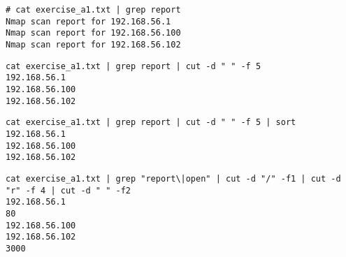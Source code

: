 \begin{verbatim}
# cat exercise_a1.txt | grep report
Nmap scan report for 192.168.56.1
Nmap scan report for 192.168.56.100
Nmap scan report for 192.168.56.102
\end{verbatim}

\begin{verbatim}
cat exercise_a1.txt | grep report | cut -d " " -f 5
192.168.56.1
192.168.56.100
192.168.56.102
\end{verbatim}

\begin{verbatim}
cat exercise_a1.txt | grep report | cut -d " " -f 5 | sort
192.168.56.1
192.168.56.100
192.168.56.102
\end{verbatim}

\begin{verbatim}
cat exercise_a1.txt | grep "report\|open" | cut -d "/" -f1 | cut -d "r" -f 4 | cut -d " " -f2                                              
192.168.56.1
80
192.168.56.100
192.168.56.102
3000
\end{verbatim}


